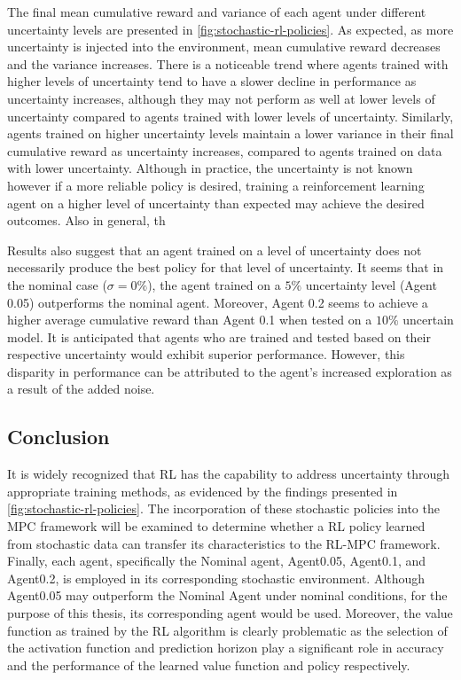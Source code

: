 The final mean cumulative reward and variance of each agent under different uncertainty levels are presented in \ref{fig:stochastic-rl-policies}. As expected, as more uncertainty is injected into the environment, mean cumulative reward decreases and the variance increases. There is a noticeable trend where agents trained with higher levels of uncertainty tend to have a slower decline in performance as uncertainty increases, although they may not perform as well at lower levels of uncertainty compared to agents trained with lower levels of uncertainty. Similarly, agents trained on higher uncertainty levels maintain a lower variance in their final cumulative reward as uncertainty increases, compared to agents trained on data with lower uncertainty. Although in practice, the uncertainty is not known however if a more reliable policy is desired, training a reinforcement learning agent on a higher level of uncertainty than expected may achieve the desired outcomes. Also in general, th

Results also suggest that an agent trained on a level of uncertainty does not necessarily produce the best policy for that level of uncertainty. It seems that in the nominal case ($\sigma = 0\%$), the agent trained on a $5\%$ uncertainty level (Agent 0.05) outperforms the nominal agent. Moreover, Agent 0.2 seems to achieve a higher average cumulative reward than Agent 0.1 when tested on a $10\%$ uncertain model. It is anticipated that agents who are trained and tested based on their respective uncertainty would exhibit superior performance. However, this disparity in performance can be attributed to the agent's increased exploration as a result of the added noise.

\subsection{Conclusion}
It is widely recognized that RL has the capability to address uncertainty through appropriate training methods, as evidenced by the findings presented in \autoref{fig:stochastic-rl-policies}. The incorporation of these stochastic policies into the MPC framework will be examined to determine whether a RL policy learned from stochastic data can transfer its characteristics to the RL-MPC framework. Finally, each agent, specifically the Nominal agent, Agent0.05, Agent0.1, and Agent0.2, is employed in its corresponding stochastic environment. Although Agent0.05 may outperform the Nominal Agent under nominal conditions, for the purpose of this thesis, its corresponding agent would be used. Moreover, the value function as trained by the RL algorithm is clearly problematic as the selection of the activation function and prediction horizon play a significant role in accuracy and the performance of the learned value function and policy respectively.

